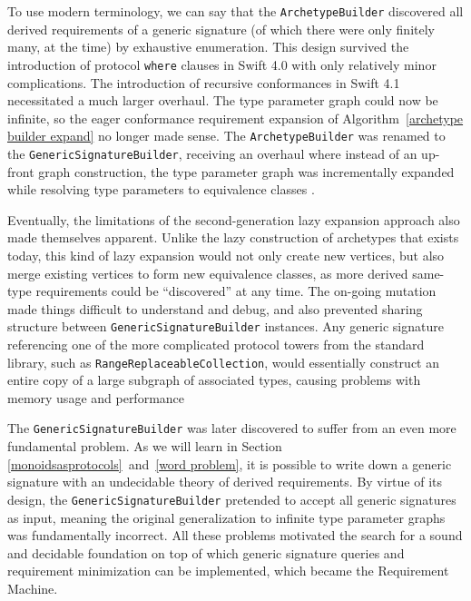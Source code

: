 \documentclass[../generics]{subfiles}
\begin{document}
To use modern terminology, we can say that the \texttt{ArchetypeBuilder} discovered all derived requirements of a generic signature (of which there were only finitely many, at the time) by exhaustive enumeration. This design survived the introduction of protocol \texttt{where} clauses in Swift 4.0 with only relatively minor complications. The introduction of recursive conformances in Swift 4.1 necessitated a much larger overhaul. The type parameter graph could now be infinite, so the eager conformance requirement expansion of Algorithm~\ref{archetype builder expand} no longer made sense. The \texttt{ArchetypeBuilder} was renamed to the \texttt{GenericSignatureBuilder}, receiving an overhaul where instead of an up-front graph construction, the type parameter graph was incrementally expanded while resolving type parameters to equivalence classes \cite{implrecursive}.

Eventually, the limitations of the second-generation lazy expansion approach also made themselves apparent. Unlike the lazy construction of archetypes that exists today, this kind of lazy expansion would not only create new vertices, but also merge existing vertices to form new equivalence classes, as more derived same-type requirements could be ``discovered'' at any time. The on-going mutation made things difficult to understand and debug, and also prevented sharing structure between \texttt{GenericSignatureBuilder} instances. Any generic signature referencing one of the more complicated protocol towers from the standard library, such as \texttt{RangeReplaceableCollection}, would essentially construct an entire copy of a large subgraph of associated types, causing problems with memory usage and performance

The \texttt{GenericSignatureBuilder} was later discovered to suffer from an even more fundamental problem. As we will learn in Section \ref{monoidsasprotocols}~and~\ref{word problem}, it is possible to write down a generic signature with an undecidable theory of derived requirements. By virtue of its design, the \texttt{GenericSignatureBuilder} pretended to accept all generic signatures as input, meaning the original generalization to infinite type parameter graphs was fundamentally incorrect. All these problems motivated the search for a sound and decidable foundation on top of which generic signature queries and requirement minimization can be implemented, which became the Requirement Machine.
\end{document}
